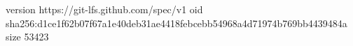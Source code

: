 version https://git-lfs.github.com/spec/v1
oid sha256:d1ce1f62b07f67a1e40deb31ae4418febcebb54968a4d71974b769bb4439484a
size 53423
